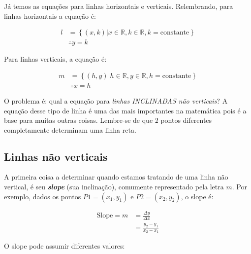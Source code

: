 \documentclass[pdftex, brazil, 12pt, twoside]{article}
\begin{document}
Já temos as equações para linhas horizontais e verticais. Relembrando, para linhas horizontais
a equação é:

\begin{equation}
  \begin{split}
               l & = \left\{(x, k) | x \in \mathbb{R}, k \in \mathbb{R}, k = \text{constante}\right\}\\
                 & \therefore y = k
  \end{split}
\end{equation}

Para linhas verticais, a equação é:

\begin{equation}
  \begin{split}
               m & = \left\{(h, y) | h \in \mathbb{R}, y \in \mathbb{R}, h = \text{constante}\right\}\\
                 & \therefore x = h
  \end{split}
\end{equation}

O problema é: qual a equação para \emph{linhas INCLINADAS não verticais}? A equação desse tipo de linha é uma
das mais importantes na matemática pois é a base para muitas outras coisas. Lembre-se
de que 2 pontos diferentes completamente determinam uma linha reta.

\subsection{Linhas não verticais}
\label{modelagem-linear-linhas-nao-verticais}

A primeira coisa a determinar quando estamos tratando de uma linha não vertical,
é seu \textbf{\emph{slope}} (sua inclinação), comumente representado pela letra $m$. Por
exemplo, dados os pontos $P1 = (x_1, y_1)$ e $P2 = (x_2, y_2)$, o slope é:

\begin{equation}
  \begin{split}
    \text{Slope} = m & = \frac{\Delta y}{\Delta x}\\
                     & = \frac{y_2 - y_1}{x_2 - x_1}
  \end{split}
\end{equation}

O slope pode assumir diferentes valores:
\end{document}
